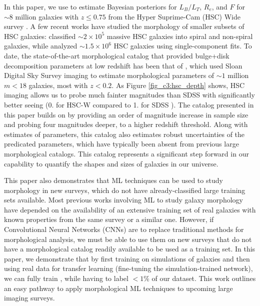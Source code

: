 In this paper, we use \gampen{} to estimate Bayesian posteriors for $L_B/L_T$, $R_e$, and $F$ for $\sim 8$ million galaxies with $z \leq 0.75$ from the Hyper Suprime-Cam (HSC) Wide survey \citep{hsc_design}. A few recent works have studied the morphology of smaller subsets of HSC galaxies: \citet{shimakawa_2021} classified $\sim2\times10^5$ massive HSC galaxies into spiral and non-spiral galaxies, while \citet{hsc_sersic} analyzed $\sim1.5\times10^6$ HSC galaxies using single-component \sersic{} fits. To date, the state-of-the-art morphological catalog that provided bulge+disk decomposition parameters at low redshift has been that of \citet{simard_11}, which used Sloan Digital Sky Survey \citep[SDSS; ][]{sdss_tech_summary} imaging to estimate morphological parameters of $\sim1$ million $m < 18$ galaxies, most with $z < 0.2$. As Figure \ref{fig_c3:hsc_depth} shows, HSC imaging allows us to probe much fainter magnitudes than SDSS with significantly better seeing (0. for HSC-W \gb{} compared to 1. for SDSS \gb{}). The catalog presented in this paper builds on \citet{simard_11} by providing an order of magnitude increase in sample size and probing four magnitudes deeper, to a higher redshift threshold. Along with estimates of parameters, this catalog also estimates robust uncertainties of the predicated parameters, which have typically been absent from previous large morphological catalogs. This catalog represents a significant step forward in our capability to quantify the shapes and sizes of galaxies in our universe. 


This paper also demonstrates that ML techniques can be used to study morphology in new surveys, which do not have already-classified large training sets available. Most previous works involving ML to study galaxy morphology have depended on the availability of an extensive training set of real galaxies with known properties from the same survey or a similar one. However, if Convolutional Neural Networks (CNNs) are to replace traditional methods for morphological analysis, we must be able to use them on new surveys that do not have a morphological catalog readily available to be used as a training set. In this paper, we demonstrate that by first training on simulations of galaxies and then using real data for transfer learning (fine-tuning the simulation-trained network), we can fully train \gampen{}, while having to label $<1\%$ of our dataset. This work outlines an easy pathway to apply morphological ML techniques to upcoming large imaging surveys.  

